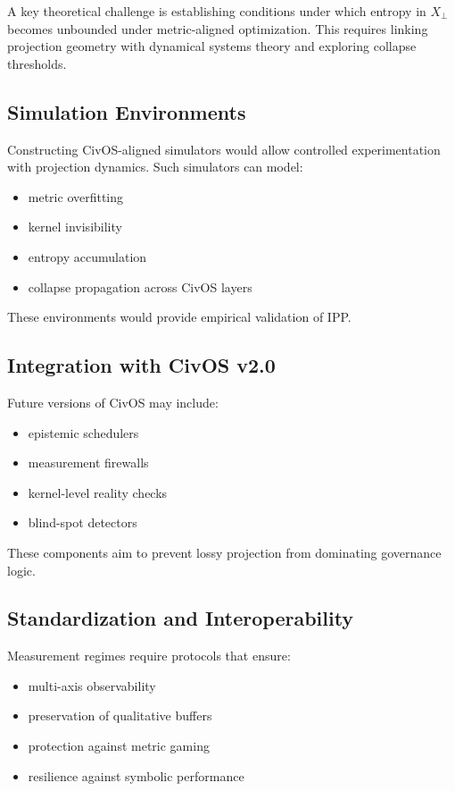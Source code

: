 \documentclass[11pt]{article}
\begin{document}
A key theoretical challenge is establishing conditions under which entropy in
$X_{\perp}$ becomes unbounded under metric-aligned optimization.
This requires linking projection geometry with dynamical systems theory and exploring collapse thresholds.

\subsection{Simulation Environments}

Constructing CivOS-aligned simulators would allow controlled experimentation with projection dynamics.
Such simulators can model:

\begin{itemize}[leftmargin=1.5em]
    \item metric overfitting
    \item kernel invisibility
    \item entropy accumulation
    \item collapse propagation across CivOS layers
\end{itemize}

These environments would provide empirical validation of IPP.

\subsection{Integration with CivOS v2.0}

Future versions of CivOS may include:

\begin{itemize}[leftmargin=1.5em]
    \item epistemic schedulers
    \item measurement firewalls
    \item kernel-level reality checks
    \item blind-spot detectors
\end{itemize}

These components aim to prevent lossy projection from dominating governance logic.

\subsection{Standardization and Interoperability}

Measurement regimes require protocols that ensure:

\begin{itemize}[leftmargin=1.5em]
    \item multi-axis observability
    \item preservation of qualitative buffers
    \item protection against metric gaming
    \item resilience against symbolic performance
\end{itemize}
\end{document}
